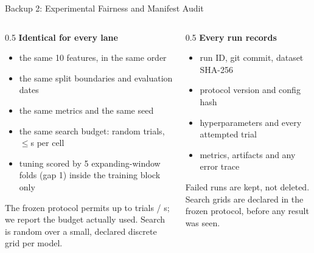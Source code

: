\documentclass[aspectratio=169,11pt]{beamer}
\begin{document}
\begin{frame}{Backup 2: Experimental Fairness and Manifest Audit}
  \begin{columns}[T]
    \begin{column}{0.5\textwidth}
      \textbf{Identical for every lane}
      \begin{itemize}\scriptsize
        \item the same 10 features, in the same order
        \item the same split boundaries and evaluation dates
        \item the same metrics and the same seed
        \item the same search budget: \TrialsUsed{} random trials,
              $\le$\SecondsUsed{}s per cell
        \item tuning scored by 5 expanding-window folds (gap 1)
              inside the training block only
      \end{itemize}
      \footnotesize
      {\scriptsize The frozen protocol permits up to \TrialsMax{} trials /
       \SecondsMax{}s; we report the budget actually used. Search is random
       over a small, declared discrete grid per model.}
    \end{column}
    \begin{column}{0.5\textwidth}
      \textbf{Every run records}
      \begin{itemize}\scriptsize
        \item run ID, git commit, dataset SHA-256
        \item protocol version and config hash
        \item hyperparameters and every attempted trial
        \item metrics, artifacts and any error trace
      \end{itemize}
      \footnotesize
      {\scriptsize Failed runs are kept, not deleted. Search grids are declared
       in the frozen protocol, before any result was seen.}
    \end{column}
  \end{columns}
\end{frame}
\end{document}
